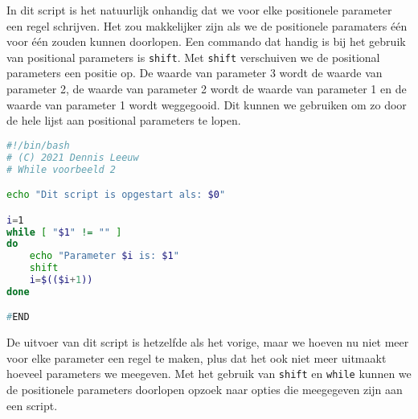In dit script is het natuurlijk onhandig dat we voor elke positionele parameter een regel schrijven. Het zou makkelijker zijn als we de positionele paramaters \'e\'en voor \'e\'en zouden kunnen doorlopen. Een commando dat handig is bij het gebruik van positional parameters is \texttt{shift}. Met \texttt{shift} verschuiven we de positional parameters een positie op. De waarde van parameter 3 wordt de waarde van parameter 2, de waarde van parameter 2 wordt de waarde van parameter 1 en de waarde van parameter 1 wordt weggegooid. Dit kunnen we gebruiken om zo door de hele lijst aan positional parameters te lopen.

\begin{lstlisting}[language=bash]
#!/bin/bash
# (C) 2021 Dennis Leeuw
# While voorbeeld 2

echo "Dit script is opgestart als: $0"

i=1
while [ "$1" != "" ]
do
	echo "Parameter $i is: $1"
	shift
	i=$(($i+1))
done

#END
\end{lstlisting}
De uitvoer van dit script is hetzelfde als het vorige, maar we hoeven nu niet meer voor elke parameter een regel te maken, plus dat het ook niet meer uitmaakt hoeveel parameters we meegeven. Met het gebruik van \texttt{shift} en \texttt{while} kunnen we de positionele parameters doorlopen opzoek naar opties die meegegeven zijn aan een script.
